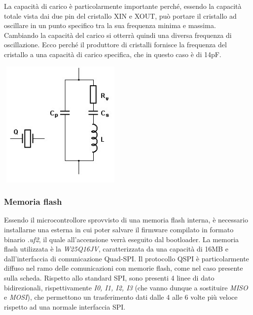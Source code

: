 La capacità di carico è particolarmente importante perché, essendo la
capacità totale vista dai due pin del cristallo XIN e XOUT, può portare
il cristallo ad oscillare in un punto specifico tra la sua frequenza
minima e massima. Cambiando la capacità del carico si otterrà quindi una
diversa frequenza di oscillazione. Ecco perché il produttore di
cristalli fornisce la frequenza del cristallo a una capacità di carico
specifica, che in questo caso è di 14pF.

\begin{center}
\includegraphics[width=2.38542in,height=2.45833in]{figures/image28.png}
\captionsetup{type=figure}
\end{center}

\hypertarget{memoria-flash}{%
\subsubsection{\texorpdfstring{\hfill\break
Memoria flash}{ Memoria flash}}\label{memoria-flash}}

Essendo il microcontrollore sprovvisto di una memoria flash interna, 
è necessario installarne una esterna in cui poter salvare il firmware compilato in formato
binario \emph{.uf2}, il quale all'accensione verrà eseguito dal bootloader. La
memoria flash utilizzata è la \emph{W25Q16JV}, caratterizzata da una capacità di 16MB e dall’interfaccia di comunicazione Quad-SPI.
Il protocollo QSPI è particolarmente diffuso nel ramo delle comunicazioni con memorie flash,
come nel caso presente sulla scheda. Rispetto allo standard SPI, sono
presenti 4 linee di dato bidirezionali, rispettivamente \emph{I0, I1,
I2, I3} (che vanno dunque a sostituire \emph{MISO} e \emph{MOSI}), che
permettono un trasferimento dati dalle 4 alle 6 volte più veloce
rispetto ad una normale interfaccia SPI.

